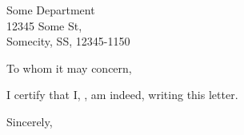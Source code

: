\documentclass{letter}
\begin{document}
\begin{letter}{Some Department\\
12345 Some St,\\
Somecity, SS, 12345-1150}

\opening{To whom it may concern,}

I certify that I, \fromname, am indeed, writing this letter.

\closing{Sincerely,}

\end{letter}
\end{document}
